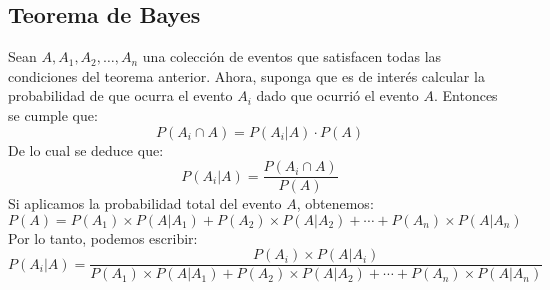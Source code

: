 \documentclass{article}
\begin{document}
    \subsection{Teorema de Bayes}
        Sean \( A, A_1, A_2, \ldots, A_n \) una colección de eventos que satisfacen todas las condiciones del teorema anterior. Ahora, suponga que es de interés calcular la probabilidad de que ocurra el evento \( A_i \) dado que ocurrió el evento \( A \). Entonces se cumple que:
        \[P(A_i \cap A) = P(A_i | A) \cdot P(A)\]
        De lo cual se deduce que:
        \[P(A_i | A) = \frac{P(A_i \cap A)}{P(A)}\]
        Si aplicamos la probabilidad total del evento \( A \), obtenemos:
        \[P(A) = P(A_1) \times P(A | A_1) + P(A_2) \times P(A | A_2) + \cdots + P(A_n) \times P(A | A_n)\]
        Por lo tanto, podemos escribir:
        \[P(A_i | A) = \frac{P(A_i) \times P(A | A_i)}{P(A_1) \times P(A | A_1) + P(A_2) \times P(A | A_2) + \cdots + P(A_n) \times P(A | A_n)}\]
        
    
\end{document}
